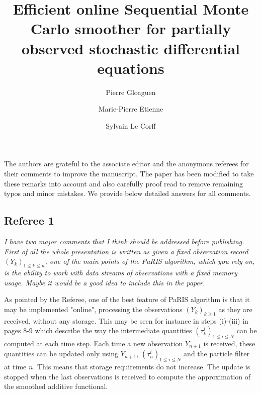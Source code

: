 \documentclass[12pt]{article}
\newcommand{\1}{\mathrm{1}}
\begin{document}
\author{Pierre Gloaguen\footnotemark[1] \and Marie-Pierre Etienne\footnotemark[1] \and Sylvain Le {C}orff\footnotemark[2]}
 


\title{Efficient online Sequential Monte Carlo smoother for partially observed stochastic differential equations}


\maketitle

The authors are grateful to the associate editor and the anonymous referees for their comments to improve the manuscript. The paper has been modified to take these remarks into account and also carefully proof read to remove remaining typos and minor mistakes. We provide below detailed answers for all comments.

\subsection*{Referee 1}
{\em I have two major comments that I think should be addressed before publishing. First of all the whole presentation is written as given a  fixed observation record $(Y_k)_{1\le k \le n}$, one of the main points of the PaRIS algorithm, which you rely on, is the ability to work with data streams of observations with a  fixed memory usage. 
Maybe it would be a good idea to include this in the paper.}

\vspace{.3cm}

As pointed by the Referee, one of the best feature of PaRIS algorithm is that it may be implemented "online", processing the observations $(Y_k)_{k\ge 1}$ as they are received, without any storage. This may be seen for instance in steps (i)-(iii) in pages 8-9 which describe the way the intermediate quantities $(\tau_k^i)_{1\le i \le N}$ can be computed at each time step. Each time a new observation $Y_{n+1}$ is received, these quantities can be updated only using $Y_{n+1}$, $(\tau_n^i)_{1\le i \le N}$ and the particle filter at time $n$. This means that storage requirements do not increase. The update is stopped when the last observations is received to compute the approximation of the smoothed additive functional. 
\end{document}
